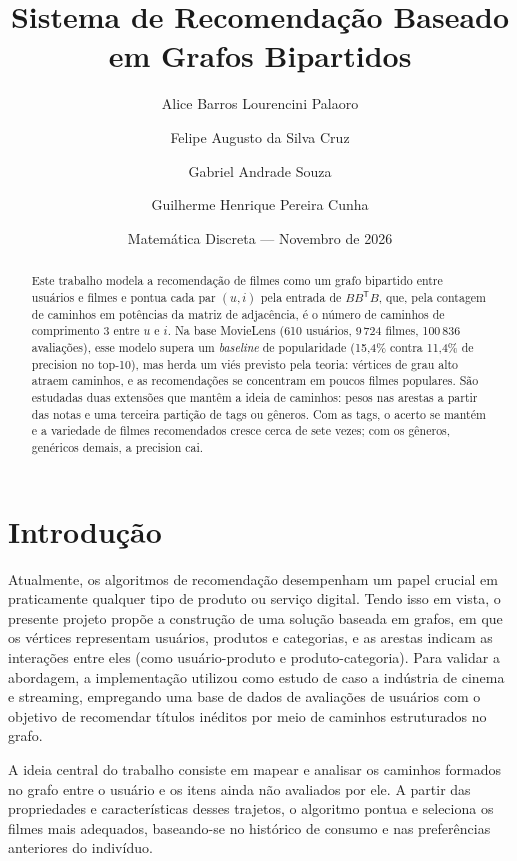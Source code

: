 \documentclass[12pt,a4paper]{article}
\title{Sistema de Recomendação Baseado em Grafos Bipartidos}
\author{Alice Barros Lourencini Palaoro \and Felipe Augusto da Silva Cruz \and
        Gabriel Andrade Souza \and Guilherme Henrique Pereira Cunha}
\date{Matemática Discreta --- Novembro de 2026}
\theoremstyle{definition}
\begin{document}
\maketitle

\begin{abstract}
Este trabalho modela a recomendação de filmes como um grafo bipartido entre usuários
e filmes e pontua cada par $(u, i)$ pela entrada de $BB^{\mathsf T}B$,
que, pela contagem de caminhos em potências da matriz de adjacência, é o
número de caminhos de comprimento 3 entre $u$ e $i$. Na base MovieLens
(610 usuários, 9\,724 filmes, 100\,836 avaliações), esse modelo supera
um \emph{baseline} de popularidade (15{,}4\% contra 11{,}4\% de precision
no top-10), mas herda um viés previsto pela teoria: vértices de grau alto
atraem caminhos, e as recomendações se concentram em poucos filmes
populares. São estudadas duas extensões que mantêm a ideia de caminhos:
pesos nas arestas a partir das notas e uma terceira partição de tags ou
gêneros. Com as tags, o acerto se mantém e a variedade de filmes
recomendados cresce cerca de sete vezes; com os gêneros, genéricos
demais, a precision cai.
\end{abstract}

\section{Introdução}\label{sec:intro}


\indent Atualmente, os algoritmos de recomendação desempenham um papel crucial em praticamente qualquer tipo de produto ou serviço digital. Tendo isso em vista, o presente projeto propõe a construção de uma solução baseada em grafos, em que os vértices representam usuários, produtos e categorias, e as arestas indicam as interações entre eles (como usuário-produto e produto-categoria). Para validar a abordagem, a implementação utilizou como estudo de caso a indústria de cinema e streaming, empregando uma base de dados de avaliações de usuários com o objetivo de recomendar títulos inéditos por meio de caminhos estruturados no grafo.

A ideia central do trabalho consiste em mapear e analisar os caminhos formados no grafo entre o usuário e os itens ainda não avaliados por ele. A partir das propriedades e características desses trajetos, o algoritmo pontua e seleciona os filmes mais adequados, baseando-se no histórico de consumo e nas preferências anteriores do indivíduo.
\end{document}
